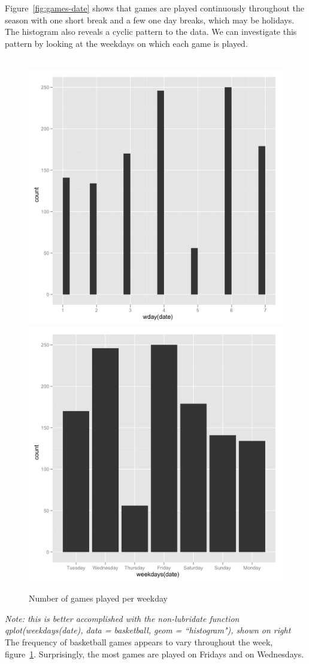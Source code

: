 \documentclass[article]{jss}
\begin{document}
Figure~\ref{fig:games-date} shows that games are played continuously throughout the season with one short break and a few one day breaks, which may be holidays. The histogram also reveals a cyclic pattern to the data. We can investigate this pattern by looking at the weekdays on which each game is played. \\

\\

\begin{figure}[htpb]
  \centering
  \includegraphics[width=.49\textwidth]{game-days-histogram.png}    
    \includegraphics[width=.49\textwidth]{weekdays-histogram.png}     
  \caption{Number of games played per weekday}
  \label{fig:games-days}
\end{figure}


\emph{Note: this is better accomplished with the non-lubridate function qplot(weekdays(date), data = basketball, geom = ``histogram"), shown on right}\\

The frequency of basketball games appears to vary throughout the week, figure~\ref{fig:games-days}. Surprisingly, the most games are played on Fridays and on Wednesdays.\\
\end{document}
